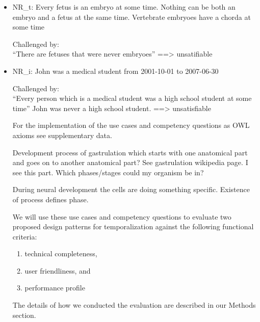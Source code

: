 \begin{itemize}


\item NR\_t: Every fetus is an embryo at some time. Nothing can be both an embryo and a fetus at the same time. Vertebrate embryoes have a chorda at some time

Challenged by: \\ ``There are fetuses that were never embryoes''  ==> unsatifiable




\item NR\_i: John was a medical student from 2001-10-01 to 2007-06-30

Challenged by: \\ ``Every person which is a medical student was a high school student at some time''   
John was never a high school student. ==> unsatisfiable




For the implementation of the use cases and competency questions as OWL axioms see supplementary data.
 

Development process of gastrulation which starts with one anatomical part and goes on to another anatomical part? See gastrulation wikipedia page. 
I see this part. Which phases/stages could my organism be in?

During neural development the cells are doing something specific. Existence of process defines phase.


We will use these use cases and competency questions to evaluate two proposed design patterns for temporalization against the following functional criteria:
\begin{enumerate}
    \item technical completeness, 
    \item user friendliness, and
    \item performance profile
\end{enumerate}
The details of how we conducted the evaluation are described in our Methods section.

\end{itemize}